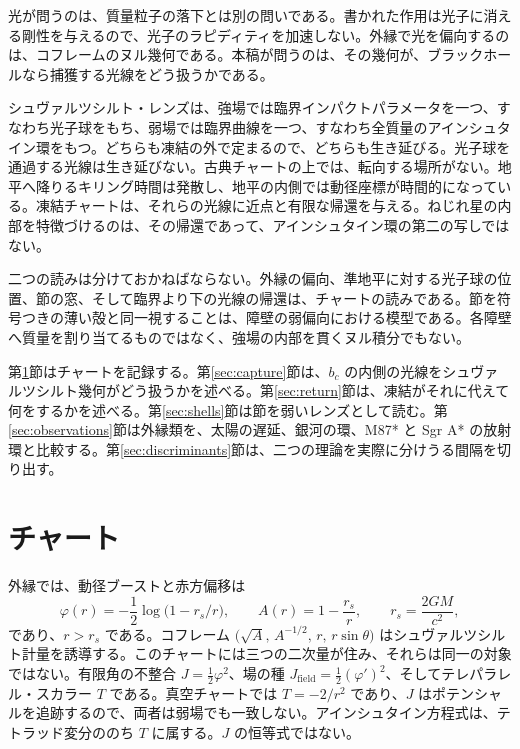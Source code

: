 \documentclass[a4paper]{article}
\begin{document}
光が問うのは、質量粒子の落下とは別の問いである。書かれた作用は光子に消える剛性を与えるので、光子のラピディティを加速しない。外縁で光を偏向するのは、コフレームのヌル幾何である。本稿が問うのは、その幾何が、ブラックホールなら捕獲する光線をどう扱うかである。

シュヴァルツシルト・レンズは、強場では臨界インパクトパラメータを一つ、すなわち光子球をもち、弱場では臨界曲線を一つ、すなわち全質量のアインシュタイン環をもつ。どちらも凍結の外で定まるので、どちらも生き延びる。光子球を通過する光線は生き延びない。古典チャートの上では、転向する場所がない。地平へ降りるキリング時間は発散し、地平の内側では動径座標が時間的になっている。凍結チャートは、それらの光線に近点と有限な帰還を与える。ねじれ星の内部を特徴づけるのは、その帰還であって、アインシュタイン環の第二の写しではない。

二つの読みは分けておかねばならない。外縁の偏向、準地平に対する光子球の位置、節の窓、そして臨界より下の光線の帰還は、チャートの読みである。節を符号つきの薄い殻と同一視することは、障壁の弱偏向における模型である。各障壁へ質量を割り当てるものではなく、強場の内部を貫くヌル積分でもない。

第\ref{sec:chart}節はチャートを記録する。第\ref{sec:capture}節は、\(b_c\) の内側の光線をシュヴァルツシルト幾何がどう扱うかを述べる。第\ref{sec:return}節は、凍結がそれに代えて何をするかを述べる。第\ref{sec:shells}節は節を弱いレンズとして読む。第\ref{sec:observations}節は外縁類を、太陽の遅延、銀河の環、M87* と Sgr A* の放射環と比較する。第\ref{sec:discriminants}節は、二つの理論を実際に分けうる間隔を切り出す。

\section{チャート}
\label{sec:chart}

外縁では、動径ブーストと赤方偏移は
\begin{equation}
\label{eq:exterior-A}
\varphi(r)=-\frac12\log\bigl(1-r_s/r\bigr),
\qquad
A(r)=1-\frac{r_s}{r},
\qquad
r_s=\frac{2GM}{c^2},
\end{equation}
であり、\(r>r_s\) である。コフレーム \(\bigl(\sqrt{A},\,A^{-1/2},\,r,\,r\sin\theta\bigr)\) はシュヴァルツシルト計量を誘導する。このチャートには三つの二次量が住み、それらは同一の対象ではない。有限角の不整合 \(J=\frac12\varphi^2\)、場の種 \(J_{\mathrm{field}}=\frac12(\varphi')^2\)、そしてテレパラレル・スカラー \(T\) である。真空チャートでは \(T=-2/r^2\) であり、\(J\) はポテンシャルを追跡するので、両者は弱場でも一致しない。アインシュタイン方程式は、テトラッド変分ののち \(T\) に属する。\(J\) の恒等式ではない。
\end{document}
